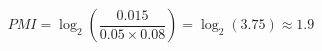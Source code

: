 \documentclass[preview]{standalone}
\begin{document}
\begin{align*}
PMI = \log_{2}\!\left(\dfrac{0.015}{0.05\times0.08}\right)=\log_{2}(3.75)\approx 1.9
\end{align*}
\end{document}

